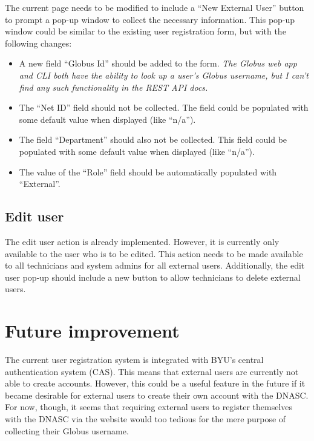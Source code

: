 The current page needs to be modified to include a ``New External User'' button to
prompt a pop-up window to collect the necessary information. This pop-up window
could be similar to the existing user registration form, but with the following
changes:
\begin{itemize}\itemsep1pt
    \item A new field ``Globus Id'' should be added to the form. \emph{The Globus web app and
    CLI both have the ability to look up a user's Globus username, but I can't find
    any such functionality in the REST API docs.}
    \item The ``Net ID'' field should not be collected. The field could be populated 
    with some default value when displayed (like ``n/a'').
    \item The field ``Department'' should also not be collected. This field could be
    populated with some default value when displayed (like ``n/a'').
    \item The value of the ``Role'' field should be automatically populated with 
    ``External''.
\end{itemize}

\subsection{Edit user}

The edit user action is already implemented. However, it is currently only available
to the user who is to be edited. This action needs to be made available to all 
technicians and system admins for all external users. Additionally, the edit user
pop-up should include a new button to allow technicians to delete external users.

\section{Future improvement}
The current user registration system is integrated with BYU's central 
authentication system (CAS). This means that external users are currently not 
able to create accounts. However, this could be a useful feature in the future 
if it became desirable for external users to create their own account with the DNASC.
For now, though, it seems that requiring external users to register themselves with 
the DNASC via the website would too tedious for the mere purpose of collecting their
Globus username.

